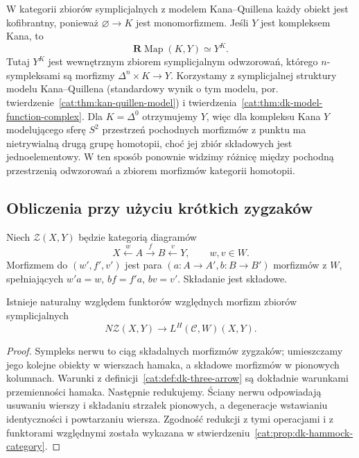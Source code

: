 \begin{przyklad}\label{cat:ex:dk-derived-mapping-kan}
W kategorii zbiorów symplicjalnych z modelem Kana--Quillena każdy obiekt jest kofibrantny, ponieważ $\varnothing\to K$ jest monomorfizmem. Jeśli $Y$ jest kompleksem Kana, to
\[
 \mathbf R\operatorname{Map}(K,Y)\simeq Y^K.
\]
Tutaj $Y^K$ jest wewnętrznym zbiorem symplicjalnym odwzorowań, którego $n$-sympleksami są morfizmy $\Delta^n\times K\to Y$. Korzystamy z symplicjalnej struktury modelu Kana--Quillena (standardowy wynik o tym modelu, por. twierdzenie~\ref{cat:thm:kan-quillen-model}) i twierdzenia~\ref{cat:thm:dk-model-function-complex}. Dla $K=\Delta^0$ otrzymujemy $Y$, więc dla kompleksu Kana $Y$ modelującego sferę $S^2$ przestrzeń pochodnych morfizmów z punktu ma nietrywialną drugą grupę homotopii, choć jej zbiór składowych jest jednoelementowy. W ten sposób ponownie widzimy różnicę między pochodną przestrzenią odwzorowań a zbiorem morfizmów kategorii homotopii.
\end{przyklad}

\subsection{Obliczenia przy użyciu krótkich zygzaków}

\begin{definicja}\label{cat:def:dk-three-arrow}
Niech $\mathcal Z(X,Y)$ będzie kategorią diagramów
\[
 X\xleftarrow{w}A\xrightarrow{f}B\xleftarrow{v}Y,\qquad w,v\in W.
\]
Morfizmem do $(w',f',v')$ jest para $(a:A\to A',b:B\to B')$ morfizmów z $W$, spełniających $w'a=w$, $bf=f'a$, $bv=v'$. Składanie jest składowe.
\end{definicja}

\begin{stwierdzenie}\label{cat:prop:dk-three-arrow-map}
Istnieje naturalny względem funktorów względnych morfizm zbiorów symplicjalnych
\[
 N\mathcal Z(X,Y)\longrightarrow L^H(\mathcal C,W)(X,Y).
\]
\end{stwierdzenie}
\begin{proof}
Sympleks nerwu to ciąg składalnych morfizmów zygzaków; umieszczamy jego kolejne obiekty w wierszach hamaka, a składowe morfizmów w pionowych kolumnach. Warunki z definicji~\ref{cat:def:dk-three-arrow} są dokładnie warunkami przemienności hamaka. Następnie redukujemy. Ściany nerwu odpowiadają usuwaniu wierszy i składaniu strzałek pionowych, a degeneracje wstawianiu identyczności i powtarzaniu wiersza. Zgodność redukcji z tymi operacjami i z funktorami względnymi została wykazana w stwierdzeniu~\ref{cat:prop:dk-hammock-category}.
\end{proof}

